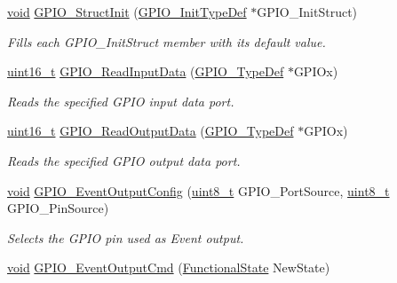 \begin{DoxyCompactItemize}
\hyperlink{usb__devapi_8h_afabf60e7f57651d6d595a02c75f07cd0}{void} \hyperlink{group___g_p_i_o___exported___functions_gab28de41278e7f8c63d0851e2733b10df}{G\+P\+I\+O\+\_\+\+Struct\+Init} (\hyperlink{struct_g_p_i_o___init_type_def}{G\+P\+I\+O\+\_\+\+Init\+Type\+Def} $\ast$G\+P\+I\+O\+\_\+\+Init\+Struct)
\begin{DoxyCompactList}\small\item\em Fills each G\+P\+I\+O\+\_\+\+Init\+Struct member with its default value. \end{DoxyCompactList}\item 
\hyperlink{_p_e___types_8h_a1f1825b69244eb3ad2c7165ddc99c956}{uint16\+\_\+t} \hyperlink{group___g_p_i_o___exported___functions_ga139a33adc8409288e9f193bbebb5a0f7}{G\+P\+I\+O\+\_\+\+Read\+Input\+Data} (\hyperlink{struct_g_p_i_o___type_def}{G\+P\+I\+O\+\_\+\+Type\+Def} $\ast$G\+P\+I\+Ox)
\begin{DoxyCompactList}\small\item\em Reads the specified G\+P\+IO input data port. \end{DoxyCompactList}\item 
\hyperlink{_p_e___types_8h_a1f1825b69244eb3ad2c7165ddc99c956}{uint16\+\_\+t} \hyperlink{group___g_p_i_o___exported___functions_gaf8938a34280b7dc3e39872a7c17bb323}{G\+P\+I\+O\+\_\+\+Read\+Output\+Data} (\hyperlink{struct_g_p_i_o___type_def}{G\+P\+I\+O\+\_\+\+Type\+Def} $\ast$G\+P\+I\+Ox)
\begin{DoxyCompactList}\small\item\em Reads the specified G\+P\+IO output data port. \end{DoxyCompactList}\item 
\hyperlink{usb__devapi_8h_afabf60e7f57651d6d595a02c75f07cd0}{void} \hyperlink{group___g_p_i_o___exported___functions_ga935f31ed7a86c6cb594cf34313b4b7af}{G\+P\+I\+O\+\_\+\+Event\+Output\+Config} (\hyperlink{_p_e___types_8h_aba7bc1797add20fe3efdf37ced1182c5}{uint8\+\_\+t} G\+P\+I\+O\+\_\+\+Port\+Source, \hyperlink{_p_e___types_8h_aba7bc1797add20fe3efdf37ced1182c5}{uint8\+\_\+t} G\+P\+I\+O\+\_\+\+Pin\+Source)
\begin{DoxyCompactList}\small\item\em Selects the G\+P\+IO pin used as Event output. \end{DoxyCompactList}\item 
\hyperlink{usb__devapi_8h_afabf60e7f57651d6d595a02c75f07cd0}{void} \hyperlink{group___g_p_i_o___exported___functions_gaf13ab3d59e467df44b492f1cdfe2f588}{G\+P\+I\+O\+\_\+\+Event\+Output\+Cmd} (\hyperlink{agilefox_2library_2inc_2stm32f10x__type_8h_ac9a7e9a35d2513ec15c3b537aaa4fba1}{Functional\+State} New\+State)

\end{DoxyCompactItemize}
